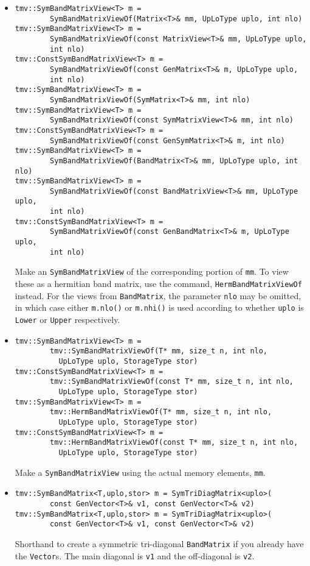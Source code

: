 \documentclass[twoside,letterpaper,11pt]{article}
\renewcommand{\tt}[1]{{\texttt {#1}}}
\begin{document}
\begin{itemize}
\item
\begin{verbatim}
tmv::SymBandMatrixView<T> m = 
        SymBandMatrixViewOf(Matrix<T>& mm, UpLoType uplo, int nlo)
tmv::SymBandMatrixView<T> m = 
        SymBandMatrixViewOf(const MatrixView<T>& mm, UpLoType uplo, 
        int nlo)
tmv::ConstSymBandMatrixView<T> m = 
        SymBandMatrixViewOf(const GenMatrix<T>& m, UpLoType uplo, 
        int nlo)
tmv::SymBandMatrixView<T> m = 
        SymBandMatrixViewOf(SymMatrix<T>& mm, int nlo)
tmv::SymBandMatrixView<T> m = 
        SymBandMatrixViewOf(const SymMatrixView<T>& mm, int nlo)
tmv::ConstSymBandMatrixView<T> m = 
        SymBandMatrixViewOf(const GenSymMatrix<T>& m, int nlo)
tmv::SymBandMatrixView<T> m = 
        SymBandMatrixViewOf(BandMatrix<T>& mm, UpLoType uplo, int nlo)
tmv::SymBandMatrixView<T> m = 
        SymBandMatrixViewOf(const BandMatrixView<T>& mm, UpLoType uplo, 
        int nlo)
tmv::ConstSymBandMatrixView<T> m = 
        SymBandMatrixViewOf(const GenBandMatrix<T>& m, UpLoType uplo, 
        int nlo)
\end{verbatim}
Make an \tt{SymBandMatrixView} of the corresponding portion of \tt{mm}.  
To view these as a hermitian band matrix, use the command,
\tt{HermBandMatrixViewOf} instead.
For the views from \tt{BandMatrix}, the parameter \tt{nlo} may be 
omitted, in which case either \tt{m.nlo()} or \tt{m.nhi()} is used 
according to whether \tt{uplo} is \tt{Lower} or \tt{Upper} respectively.

\item
\begin{verbatim}
tmv::SymBandMatrixView<T> m = 
        tmv::SymBandMatrixViewOf(T* mm, size_t n, int nlo, 
          UpLoType uplo, StorageType stor)
tmv::ConstSymBandMatrixView<T> m = 
        tmv::SymBandMatrixViewOf(const T* mm, size_t n, int nlo, 
          UpLoType uplo, StorageType stor)
tmv::SymBandMatrixView<T> m = 
        tmv::HermBandMatrixViewOf(T* mm, size_t n, int nlo, 
          UpLoType uplo, StorageType stor)
tmv::ConstSymBandMatrixView<T> m = 
        tmv::HermBandMatrixViewOf(const T* mm, size_t n, int nlo, 
          UpLoType uplo, StorageType stor)
\end{verbatim}
Make a \tt{SymBandMatrixView} using the actual memory elements, \tt{mm}.

\item
\begin{verbatim}
tmv::SymBandMatrix<T,uplo,stor> m = SymTriDiagMatrix<uplo>(
        const GenVector<T>& v1, const GenVector<T>& v2)
tmv::SymBandMatrix<T,uplo,stor> m = SymTriDiagMatrix<uplo>(
        const GenVector<T>& v1, const GenVector<T>& v2)
\end{verbatim}
Shorthand to create a symmetric tri-diagonal \tt{BandMatrix} 
if you already have the \tt{Vector}s.  
The main diagonal is \tt{v1} and the off-diagonal is \tt{v2}.


\end{itemize}
\end{document}
